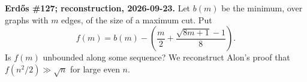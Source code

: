 \textbf{Erd\H{o}s \#127; reconstruction, 2026-09-23.}
Let $b(m)$ be the minimum, over graphs with $m$ edges, of the size of
a maximum cut. Put
\[
 f(m)=b(m)-\left(\frac m2+\frac{\sqrt{8m+1}-1}{8}\right).
\]
Is $f(m)$ unbounded along some sequence? We reconstruct Alon's proof
that $f(n^2/2)\gg\sqrt n$ for large even $n$.
